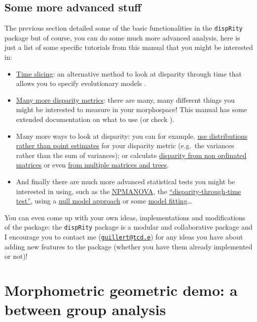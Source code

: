 \documentclass[
]{book}
\providecommand{\tightlist}{%
  \setlength{\itemsep}{0pt}\setlength{\parskip}{0pt}}
\begin{document}
\hypertarget{some-more-advanced-stuff}{%
\section{Some more advanced stuff}\label{some-more-advanced-stuff}}

The previous section detailed some of the basic functionalities in the \texttt{dispRity} package but of course, you can do some much more advanced analysis, here is just a list of some specific tutorials from this manual that you might be interested in:

\begin{itemize}
\tightlist
\item
  \protect\hyperlink{time-slicing}{Time slicing}: an alternative method to look at disparity through time that allows you to specify evolutionary models \citep{time-slice}.
\item
  \protect\hyperlink{disparity-metrics}{Many more disparity metrics}: there are many, many different things you might be interested to measure in your morphospace! This manual has some extended documentation on what to use (or check \citet{moms}).
\item
  Many more ways to look at disparity: you can for example, \protect\hyperlink{disparity-distribution}{use distributions rather than point estimates} for your disparity metric (e.g.~the variances rather than the sum of variances); or calculate \protect\hyperlink{other-matrices}{disparity from non ordinated matrices} or even \protect\hyperlink{multi.input}{from multiple matrices and trees}.
\item
  And finally there are much more advanced statistical tests you might be interested in using, such as the \protect\hyperlink{adonis}{NPMANOVA}, the \protect\hyperlink{dtt}{``disparity-through-time test''}, using a \protect\hyperlink{null-test}{null model approach} or some \protect\hyperlink{model-fitting}{model fitting}\ldots{}
\end{itemize}

You can even come up with your own ideas, implementations and modifications of the package: the \texttt{dispRity} package is a modular and collaborative package and I encourage you to contact me (\href{mailto:guillert@tcd.e}{\nolinkurl{guillert@tcd.e}}) for any ideas you have about adding new features to the package (whether you have them already implemented or not)!

\hypertarget{morphometric-geometric-demo-a-between-group-analysis}{%
\chapter{Morphometric geometric demo: a between group analysis}\label{morphometric-geometric-demo-a-between-group-analysis}}
\end{document}
